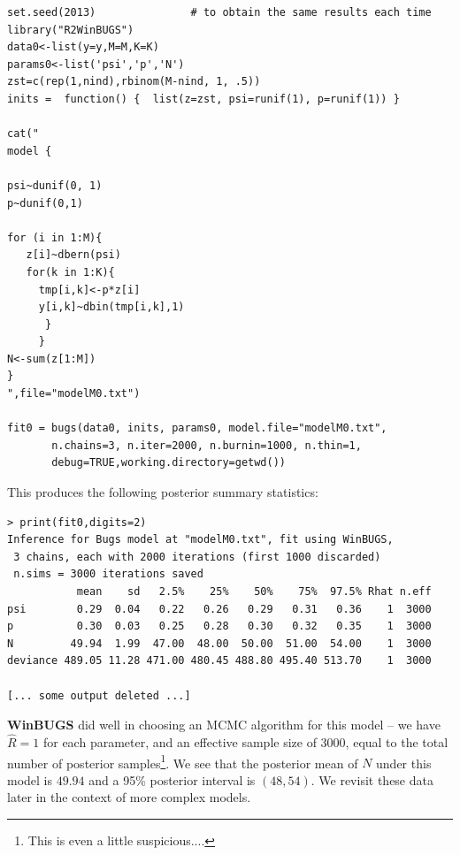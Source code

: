 {\small
\begin{verbatim}
set.seed(2013)               # to obtain the same results each time
library("R2WinBUGS")
data0<-list(y=y,M=M,K=K)
params0<-list('psi','p','N')
zst=c(rep(1,nind),rbinom(M-nind, 1, .5))
inits =  function() {  list(z=zst, psi=runif(1), p=runif(1)) }

cat("
model {

psi~dunif(0, 1)
p~dunif(0,1)

for (i in 1:M){
   z[i]~dbern(psi)
   for(k in 1:K){
     tmp[i,k]<-p*z[i]
     y[i,k]~dbin(tmp[i,k],1)
      }
     }
N<-sum(z[1:M])
}
",file="modelM0.txt")

fit0 = bugs(data0, inits, params0, model.file="modelM0.txt",
       n.chains=3, n.iter=2000, n.burnin=1000, n.thin=1,
       debug=TRUE,working.directory=getwd())
\end{verbatim}
}
This produces the following posterior
 summary statistics:
{\small
\begin{verbatim}
> print(fit0,digits=2)
Inference for Bugs model at "modelM0.txt", fit using WinBUGS,
 3 chains, each with 2000 iterations (first 1000 discarded)
 n.sims = 3000 iterations saved
           mean    sd   2.5%    25%    50%    75%  97.5% Rhat n.eff
psi        0.29  0.04   0.22   0.26   0.29   0.31   0.36    1  3000
p          0.30  0.03   0.25   0.28   0.30   0.32   0.35    1  3000
N         49.94  1.99  47.00  48.00  50.00  51.00  54.00    1  3000
deviance 489.05 11.28 471.00 480.45 488.80 495.40 513.70    1  3000

[... some output deleted ...]
\end{verbatim}
}
{\bf WinBUGS} did well in choosing an MCMC algorithm for this model --
we have $\hat{R} = 1$ for each parameter, and an effective sample size
of 3000, equal to the total number of posterior samples\footnote{This is even a little
suspicious....}.
We see that the posterior mean of $N$ under this
model is $49.94$ and a 95\% posterior interval is $(48,54)$.  We
revisit these data later in the context of more complex models.

